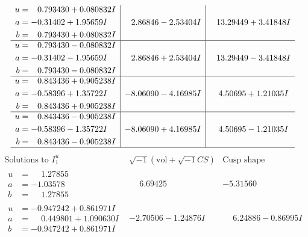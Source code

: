 \documentclass[1p]{elsarticle_modified}
\theoremstyle{definition}
\newcommand{\I}{\sqrt{-1}}
\begin{document}
$$\begin{array}{c|c|c}
\begin{aligned}
u &= \phantom{-}0.793430 + 0.080832 I \\
a &= -0.31402 + 1.95659 I \\
b &= \phantom{-}0.793430 + 0.080832 I\end{aligned}
 & \phantom{-}2.86846 - 2.53404 I & \phantom{-}13.29449 + 3.41848 I \\ \hline\begin{aligned}
u &= \phantom{-}0.793430 - 0.080832 I \\
a &= -0.31402 - 1.95659 I \\
b &= \phantom{-}0.793430 - 0.080832 I\end{aligned}
 & \phantom{-}2.86846 + 2.53404 I & \phantom{-}13.29449 - 3.41848 I \\ \hline\begin{aligned}
u &= \phantom{-}0.843436 + 0.905238 I \\
a &= -0.58396 + 1.35722 I \\
b &= \phantom{-}0.843436 + 0.905238 I\end{aligned}
 & -8.06090 - 4.16985 I & \phantom{-}4.50695 + 1.21035 I \\ \hline\begin{aligned}
u &= \phantom{-}0.843436 - 0.905238 I \\
a &= -0.58396 - 1.35722 I \\
b &= \phantom{-}0.843436 - 0.905238 I\end{aligned}
 & -8.06090 + 4.16985 I & \phantom{-}4.50695 - 1.21035 I\\
 \hline 
 \end{array}$$\newpage$$\begin{array}{c|c|c}  
\text{Solutions to }I^u_{1}& \I (\text{vol} + \sqrt{-1}CS) & \text{Cusp shape}\\
 \hline 
\begin{aligned}
u &= \phantom{-}1.27855\phantom{ +0.000000I} \\
a &= -1.03578\phantom{ +0.000000I} \\
b &= \phantom{-}1.27855\phantom{ +0.000000I}\end{aligned}
 & \phantom{-}6.69425\phantom{ +0.000000I} & -5.31560\phantom{ +0.000000I} \\ \hline\begin{aligned}
u &= -0.947242 + 0.861971 I \\
a &= \phantom{-}0.449801 + 1.090630 I \\
b &= -0.947242 + 0.861971 I\end{aligned}
 & -2.70506 - 1.24876 I & \phantom{-}6.24886 - 0.86995 I \\ \hline\begin{aligned}

\end{aligned}
\end{array}$$
\end{document}
